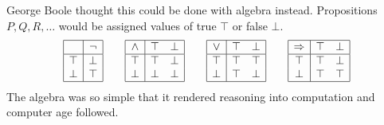 George Boole  thought 
this could be done with algebra instead.  Propositions $P,Q,R,\ldots$
would be assigned values of true $\top$ or false $\bot$. 
\begin{gather*}
    \begin{array}{|c|c|}
        \hline 
         & \neg \\
        \hline 
        \top & \bot \\
        \bot & \top\\
        \hline
    \end{array}
    \qquad
    \begin{array}{|c|cc|}
        \hline 
        \wedge & \top & \bot\\
        \hline 
        \top & \top & \bot \\
        \bot & \bot & \bot\\
        \hline
    \end{array}
    \qquad 
    \begin{array}{|c|cc|}
        \hline 
        \vee & \top & \bot\\
        \hline 
        \top & \top & \top \\
        \bot & \top & \bot\\
        \hline
    \end{array}
    \qquad
    \begin{array}{|c|cc|}
        \hline 
        \Rightarrow & \top & \bot\\
        \hline 
        \top & \top & \bot \\
        \bot & \top & \top\\
        \hline
    \end{array}
\end{gather*}
The algebra was so simple that it rendered reasoning 
into computation and computer age followed.